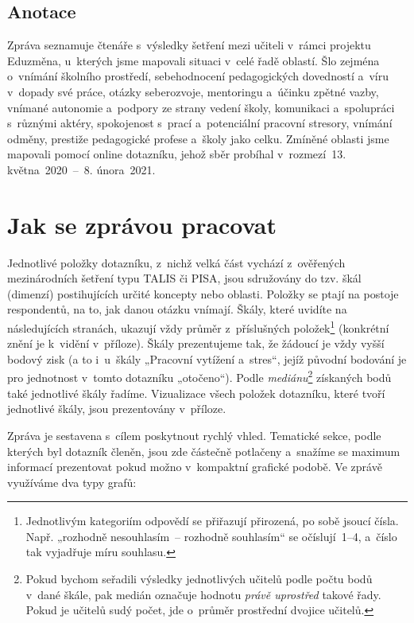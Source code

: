 \documentclass[12pt,a4paper,]{report}
\begin{document}
\thispagestyle{empty}
\section*{Anotace}
Zpráva seznamuje čtenáře s~výsledky šetření mezi učiteli v~rámci projektu Eduzměna, u~kterých jsme mapovali situaci v~celé řadě oblastí. Šlo zejména o~vnímání školního prostředí, sebehodnocení pedagogických dovedností a~víru v~dopady své práce, otázky seberozvoje, mentoringu a~účinku zpětné vazby, vnímané autonomie a~podpory ze strany vedení školy, komunikaci a~spolupráci s~různými aktéry, spokojenost s~prací a~potenciální pracovní stresory, vnímání odměny, prestiže pedagogické profese a~školy jako celku. Zmíněné oblasti jsme mapovali pomocí online dotazníku, jehož sběr probíhal v~rozmezí~13. května~2020~--~8. února~2021.


{
\renewcommand*\contentsname{Obsah zprávy}
\setcounter{tocdepth}{1}
\tableofcontents
}

\newpage

\hypertarget{jak-se-zpruxe1vou-pracovat}{%
\chapter{Jak se zprávou pracovat}\label{jak-se-zpruxe1vou-pracovat}}

Jednotlivé položky dotazníku, z~nichž velká část vychází z~ověřených mezinárodních šetření typu TALIS či PISA, jsou sdružovány do tzv. škál (dimenzí) postihujících určité koncepty nebo oblasti. Položky se ptají na postoje respondentů, na to, jak danou otázku vnímají. Škály, které uvidíte na následujících stranách, ukazují vždy průměr z~příslušných položek\footnote{Jednotlivým kategoriím odpovědí se přiřazují přirozená, po sobě jsoucí čísla. Např. „rozhodně nesouhlasím~-- rozhodně souhlasím`` se očíslují~1--4, a~číslo tak vyjadřuje míru souhlasu.} (konkrétní znění je k~vidění v~příloze). Škály prezentujeme tak, že žádoucí je vždy vyšší bodový zisk (a to i~u~škály „Pracovní vytížení a~stres``, jejíž původní bodování je pro jednotnost v~tomto dotazníku „otočeno``). Podle \emph{mediánu}\footnote{Pokud bychom seřadili výsledky jednotlivých učitelů podle počtu bodů v~dané škále, pak medián označuje hodnotu \emph{právě uprostřed} takové řady. Pokud je učitelů sudý počet, jde o~průměr prostřední dvojice učitelů.} získaných bodů také jednotlivé škály řadíme. Vizualizace všech položek dotazníku, které tvoří jednotlivé škály, jsou prezentovány v~příloze.

Zpráva je sestavena s~cílem poskytnout rychlý vhled. Tematické sekce, podle kterých byl dotazník členěn, jsou zde částečně potlačeny a~snažíme se maximum informací prezentovat pokud možno v~kompaktní grafické podobě. Ve zprávě využíváme dva typy grafů:
\end{document}
